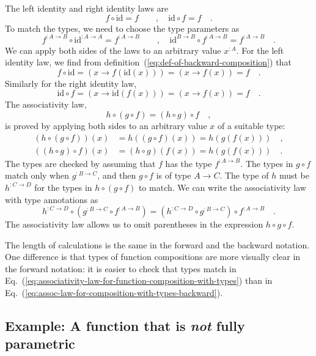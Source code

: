 The left identity and right identity laws are
\[
f\circ\text{id}=f\quad\quad,\quad\text{id}\circ f=f\quad.
\]
To match the types, we need to choose the type parameters as
\[
f^{:A\rightarrow B}\circ\text{id}^{:A\rightarrow A}=f^{:A\rightarrow B}\quad\quad,\quad\text{id}^{B\rightarrow B}\circ f^{:A\rightarrow B}=f^{:A\rightarrow B}\quad.
\]
We can apply both sides of the laws to an arbitrary value $x^{:A}$.
For the left identity law, we find from definition~(\ref{eq:def-of-backward-composition})
that
\[
f\circ\text{id}=\left(x\rightarrow f(\text{id}(x))\right)=\left(x\rightarrow f(x)\right)=f\quad.
\]
Similarly for the right identity law,
\[
\text{id}\circ f=\left(x\rightarrow\text{id}(f(x))\right)=\left(x\rightarrow f\left(x\right)\right)=f\quad.
\]
The associativity law,
\[
h\circ\left(g\circ f\right)=\left(h\circ g\right)\circ f\quad,
\]
is proved by applying both sides to an arbitrary value $x$ of a suitable
type:
\begin{align*}
\left(h\circ\left(g\circ f\right)\right)(x) & =h\left(\left(g\circ f\right)(x)\right)=h\left(g\left(f\left(x\right)\right)\right)\quad,\\
\left(\left(h\circ g\right)\circ f\right)(x) & =\left(h\circ g\right)\left(f(x)\right)=h\left(g\left(f\left(x\right)\right)\right)\quad.
\end{align*}
The types are checked by assuming that $f$ has the type $f^{:A\rightarrow B}$.
The types in $g\circ f$ match only when $g^{:B\rightarrow C}$, and
then $g\circ f$ is of type $A\rightarrow C$. The type of $h$ must
be $h^{:C\rightarrow D}$ for the types in $h\circ\left(g\circ f\right)$
to match. We can write the associativity law with type annotations
as
\begin{equation}
h^{:C\rightarrow D}\circ(g^{:B\rightarrow C}\circ f^{:A\rightarrow B})=(h^{:C\rightarrow D}\circ g^{:B\rightarrow C})\circ f^{:A\rightarrow B}\quad.\label{eq:assoc-law-for-composition-with-types-backward}
\end{equation}
The associativity law allows us to omit parentheses in the expression
$h\circ g\circ f$. 

The length of calculations is the same in the forward and the backward
notation. One difference is that types of function compositions are
more visually clear in the forward notation: it is easier to check
that types match in Eq.~(\ref{eq:associativity-law-for-function-composition-with-types})
than in Eq.~(\ref{eq:assoc-law-for-composition-with-types-backward}).

\subsection{Example: A function that is \emph{not} fully parametric}

